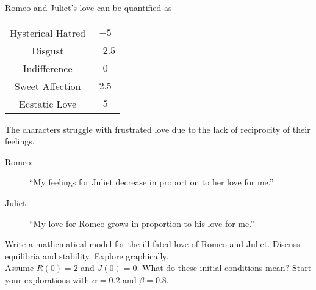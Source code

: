 \begin{problem}
    Romeo and Juliet's love can be quantified as
    \begin{center}
        \begin{tabular}{|c|c|}
            \hline
            Hysterical Hatred & $-5$ \\
            Disgust & $-2.5$ \\
            Indifference & $0$ \\
            Sweet Affection & $2.5$ \\
            Ecstatic Love & $5$ \\ \hline
        \end{tabular}
    \end{center}
    The characters struggle with frustrated love due to the lack of reciprocity of their
    feelings.
    \begin{description}
        \item[Romeo:] ``My feelings for Juliet decrease in proportion to her love for
            me.''
        \item[Juliet:] ``My love for Romeo grows in proportion to his love for me.''
    \end{description}
    Write a mathematical model for the ill-fated love of Romeo and Juliet.  Discuss
    equilibria and stability. Explore graphically. \\Assume $R(0) = 2$ and $J(0)=0$.  What do these initial
    conditions mean? Start your explorations with $\alpha = 0.2$ and $\beta = 0.8$.
\end{problem}



